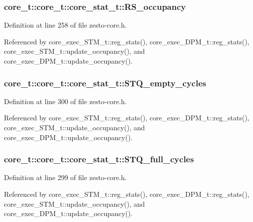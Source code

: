 \subsubsection[{RS\_\-occupancy}]{ core\_\-t::core\_\-t::core\_\-stat\_\-t::RS\_\-occupancy}\label{structcore__t_1_1core__stat__t_e60b98f996e4dbbb1b186dbe35c1e234}




Definition at line 258 of file zesto-core.h.

Referenced by core\_\-exec\_\-STM\_\-t::reg\_\-stats(), core\_\-exec\_\-DPM\_\-t::reg\_\-stats(), core\_\-exec\_\-STM\_\-t::update\_\-occupancy(), and core\_\-exec\_\-DPM\_\-t::update\_\-occupancy().
\subsubsection[{STQ\_\-empty\_\-cycles}]{ core\_\-t::core\_\-t::core\_\-stat\_\-t::STQ\_\-empty\_\-cycles}\label{structcore__t_1_1core__stat__t_06d788186a25803ec4a760efceee91dd}




Definition at line 300 of file zesto-core.h.

Referenced by core\_\-exec\_\-STM\_\-t::reg\_\-stats(), core\_\-exec\_\-DPM\_\-t::reg\_\-stats(), core\_\-exec\_\-STM\_\-t::update\_\-occupancy(), and core\_\-exec\_\-DPM\_\-t::update\_\-occupancy().
\subsubsection[{STQ\_\-full\_\-cycles}]{ core\_\-t::core\_\-t::core\_\-stat\_\-t::STQ\_\-full\_\-cycles}\label{structcore__t_1_1core__stat__t_ff713272c88f24d8fd792c082fa9e22b}




Definition at line 299 of file zesto-core.h.

Referenced by core\_\-exec\_\-STM\_\-t::reg\_\-stats(), core\_\-exec\_\-DPM\_\-t::reg\_\-stats(), core\_\-exec\_\-STM\_\-t::update\_\-occupancy(), and core\_\-exec\_\-DPM\_\-t::update\_\-occupancy().
